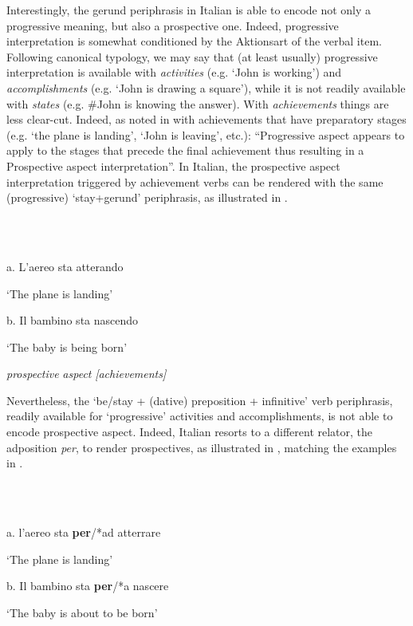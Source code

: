 \documentclass[output=paper]{langsci/langscibook}
\begin{document}
Interestingly, the gerund periphrasis in Italian is able to encode not only a progressive meaning, but also a prospective one. Indeed, progressive interpretation is somewhat conditioned by the Aktionsart of the verbal item. Following  canonical typology, we may say that (at least usually) progressive interpretation is available with \textit{activities} (e.g. ‘John is working’) and \textit{accomplishments} (e.g. ‘John is drawing a square’), while it is not readily available with \textit{states} (e.g. \#John is knowing the answer). With \textit{achievements} things are less clear-cut. Indeed, as noted in \citet[538]{Cinque2017} with achievements that have preparatory stages (e.g. ‘the plane is landing’, ‘John is leaving’, etc.): “Progressive aspect appears to apply to the stages that precede the final achievement thus resulting in a Prospective aspect interpretation”. In Italian, the prospective aspect interpretation triggered by achievement verbs can be rendered with the same (progressive) ‘stay+gerund’ periphrasis, as illustrated in .

\ea%
    \label{ex:key:22}
    \gll\\
        \\
    \glt
    \z

          a.  L’aereo sta atterando     

    ‘The plane is landing’      

b.  Il bambino sta nascendo  

  ‘The baby is being born’

\textit{prospective} \textit{aspect}   \textit{[achievements]}

Nevertheless, the ‘be/stay + (dative) preposition + infinitive’ verb periphrasis, readily available for ‘progressive’ activities and accomplishments, is not able to encode prospective aspect. Indeed, Italian resorts to a different relator, the adposition \textit{per}, to render prospectives, as illustrated in , matching the examples in .

\ea%
    \label{ex:key:23}
    \gll\\
        \\
    \glt
    \z

          a.  l’aereo sta \textbf{per}/*ad atterrare

    ‘The plane is landing’  

b.  Il bambino sta \textbf{per}/*a nascere

  ‘The baby is about to be born’
\end{document}
